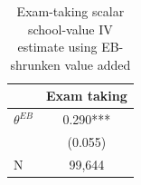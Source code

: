 \begin{table}[!htbp]
\centering
\caption{Exam-taking scalar school-value IV estimate using EB-shrunken value added}
\label{tab:scalar_school_value_iv_exam_taking_expected_va_eb}
\begin{tabular}{lc}
\toprule
 & Exam taking \\
\midrule
$\theta^{EB}$ & 0.290*** \\
 & (0.055) \\
N & 99,644 \\
\bottomrule
\end{tabular}
\end{table}
